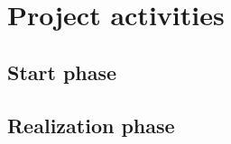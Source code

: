 \documentclass{report}
\begin{document}
	
	\chapter{Project activities}
	
	
	\section{Start phase}
	
	\section{Realization phase}
	
	
\end{document}
